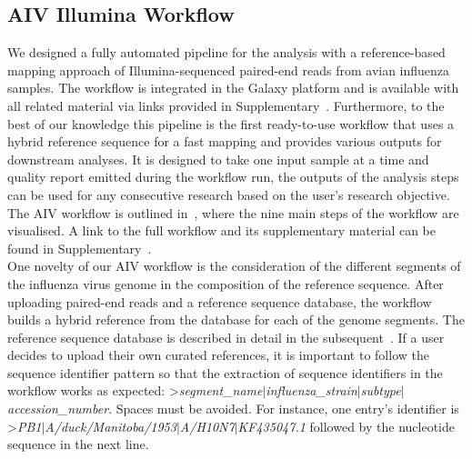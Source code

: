 \subsection{AIV Illumina Workflow}\label{sec:aiv-wf}
We designed a fully automated pipeline for the analysis with a reference-based mapping approach of Illumina-sequenced paired-end reads from avian influenza samples. The workflow is integrated in the Galaxy platform and is available with all related material via links provided in Supplementary~. Furthermore, to the best of our knowledge this pipeline is the first ready-to-use workflow that uses a hybrid reference sequence for a fast mapping and provides various outputs for downstream analyses. It is designed to take one input sample at a time and quality report emitted during the workflow run, the outputs of the analysis steps can be used for any consecutive research based on the user's research objective. The \ac{AIV} workflow is outlined in~, where the nine main steps of the workflow are visualised. A link to the full workflow and its supplementary material can be found in Supplementary~. \\
One novelty of our \ac{AIV} workflow is the consideration of the different segments of the influenza virus genome in the composition of the reference sequence. After uploading paired-end reads and a reference sequence database, the workflow builds a hybrid reference from the database for each of the genome segments. The reference sequence database is described in detail in the subsequent~. If a user decides to upload their own curated references, it is important to follow the sequence identifier pattern so that the extraction of sequence identifiers in the workflow works as expected: >\textit{segment\_name$\mid$influenza\_strain$\mid$subtype$\mid$accession\_number}. Spaces must be avoided. For instance, one entry's identifier is >\textit{PB1$\mid$A/duck/Manitoba/1953$\mid$A/H10N7$\mid$KF435047.1} followed by the nucleotide sequence in the next line. 

